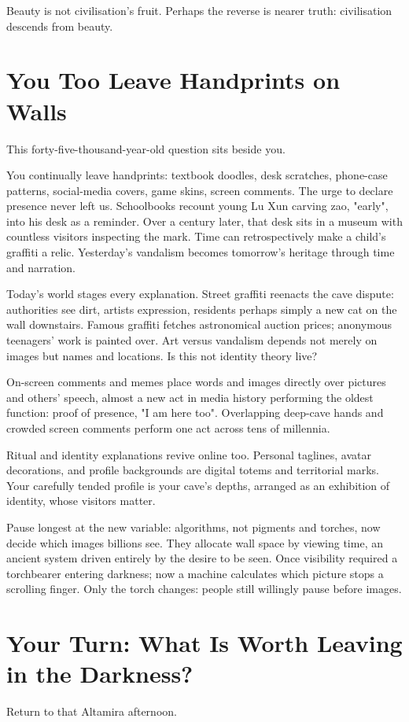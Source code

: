 Beauty is not civilisation's fruit. Perhaps the reverse is nearer truth: civilisation descends from beauty.

\section{You Too Leave Handprints on Walls}
This forty-five-thousand-year-old question sits beside you.

You continually leave handprints: textbook doodles, desk scratches, phone-case patterns, social-media covers, game skins, screen comments. The urge to declare presence never left us. Schoolbooks recount young Lu Xun carving zao, "early", into his desk as a reminder. Over a century later, that desk sits in a museum with countless visitors inspecting the mark. Time can retrospectively make a child's graffiti a relic. Yesterday's vandalism becomes tomorrow's heritage through time and narration.

Today's world stages every explanation. Street graffiti reenacts the cave dispute: authorities see dirt, artists expression, residents perhaps simply a new cat on the wall downstairs. Famous graffiti fetches astronomical auction prices; anonymous teenagers' work is painted over. Art versus vandalism depends not merely on images but names and locations. Is this not identity theory live?

On-screen comments and memes place words and images directly over pictures and others' speech, almost a new act in media history performing the oldest function: proof of presence, "I am here too". Overlapping deep-cave hands and crowded screen comments perform one act across tens of millennia.

Ritual and identity explanations revive online too. Personal taglines, avatar decorations, and profile backgrounds are digital totems and territorial marks. Your carefully tended profile is your cave's depths, arranged as an exhibition of identity, whose visitors matter.

Pause longest at the new variable: algorithms, not pigments and torches, now decide which images billions see. They allocate wall space by viewing time, an ancient system driven entirely by the desire to be seen. Once visibility required a torchbearer entering darkness; now a machine calculates which picture stops a scrolling finger. Only the torch changes: people still willingly pause before images.

\section[Your Turn: What to Leave in the Dark]{Your Turn: What Is Worth Leaving in the Darkness?}
Return to that Altamira afternoon.

